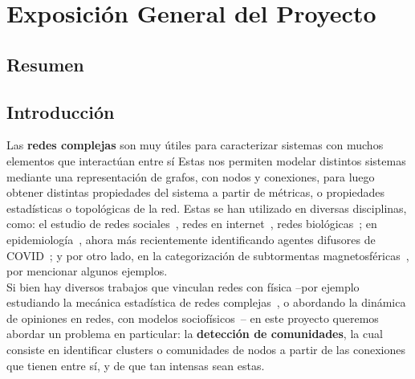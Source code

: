 \documentclass{proyectotesis}
\begin{document}
\newpage

\section{Exposición General del Proyecto}
\subsection{Resumen}

\subsection{Introducción}
Las \textbf{redes complejas} son muy útiles para caracterizar sistemas con muchos elementos que interactúan entre sí Estas nos permiten modelar distintos sistemas mediante una representación de grafos, con nodos y conexiones, para luego obtener distintas propiedades del sistema a partir de métricas, o propiedades estadísticas o topológicas de la red. Estas se han utilizado en diversas disciplinas, como: el estudio de redes sociales~\cite{newman_structure_2003, cantwell_friendship_2021}, redes en internet~\cite{newman_structure_2003}, redes biológicas~\cite{newman_structure_2003, da_fontoura_costa_complex_2008}; en epidemiología~\cite{karrer_competing_2011}, ahora más recientemente identificando agentes difusores de COVID~\cite{montes-orozco_identification_2020}; y por otro lado, en la categorización de subtormentas magnetosféricas~\cite{dods_network_2015}, por mencionar algunos ejemplos.\\

Si bien hay diversos trabajos que vinculan redes con física --por ejemplo estudiando la mecánica estadística de redes complejas~\cite{albert_statistical_2001, pastor-satorras_statistical_2003}, o abordando la dinámica de opiniones en redes, con modelos sociofísicos~\cite{suchecki_conservation_2005, castellano_statistical_2009}-- en este proyecto queremos abordar un problema en particular: la \textbf{detección de comunidades}, la cual consiste en identificar clusters o comunidades de nodos a partir de las conexiones que tienen entre sí, y de que tan intensas sean estas.\\

\end{document}
